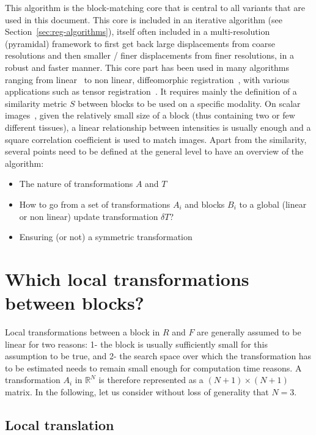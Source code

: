 \documentclass[a4paper]{article}
\begin{document}
This algorithm is the block-matching core that is central to all variants that are used in this document. This core is included in an iterative algorithm (see Section~\ref{sec:reg-algorithms}), itself often included in a multi-resolution (pyramidal) framework to first get back large displacements from coarse resolutions and then smaller / finer displacements from finer resolutions, in a robust and faster manner. This core part has been used in many algorithms ranging from linear~\cite{Ourselin_Miccai_2000,commowick:inserm-00681610} to non linear, diffeomorphic registration~\cite{Commowick_Miccai_2012}, with various applications such as tensor registration~\cite{suarez:inserm-00657707}. It requires mainly the definition of a similarity metric $S$ between blocks to be used on a specific modality. On scalar images~\cite{Malandain_Neuroimage_2004}, given the relatively small size of a block (thus containing two or few different tissues), a linear relationship between intensities is usually enough and a square correlation coefficient is used to match images. Apart from the similarity, several points need to be defined at the general level to have an overview of the algorithm:

\begin{itemize}
 	\item The nature of transformations $A$ and $T$
 	\item How to go from a set of transformations $A_i$ and blocks $B_i$ to a global (linear or non linear) update transformation $\delta T$?
 	\item Ensuring (or not) a symmetric transformation
 \end{itemize}

\section{Which local transformations between blocks?}
\label{sec:local_trsfs_blocks}

Local transformations between a block in $R$ and $F$ are generally assumed to be linear for two reasons: 1- the block is usually sufficiently small for this assumption to be true, and 2- the search space over which the transformation has to be estimated needs to remain small enough for computation time reasons. A transformation $A_i$ in $\mathbb{R}^N$ is therefore represented as a $(N+1)\times(N+1)$ matrix. In the following, let us consider without loss of generality that $N=3$.

\subsection{Local translation}
\end{document}
